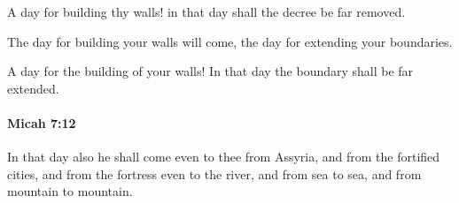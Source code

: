 			\begin{versebox}
					\item[BHS] 
					\item[LXX] 
					\item[ASV] A day for building thy walls! in that day shall the decree be far removed.
					\item[NIV] The day for building your walls will come, the day for extending your boundaries.
					\item[NRSV] A day for the building of your walls! In that day the boundary shall be far extended.
			\end{versebox}

		\paragraph{Micah 7:12} %
			\label{MICAH-7-12}

			In that day also he shall come even to thee from Assyria, and from the fortified cities, and from the fortress even to the river, and from sea to sea, and from mountain to mountain.

